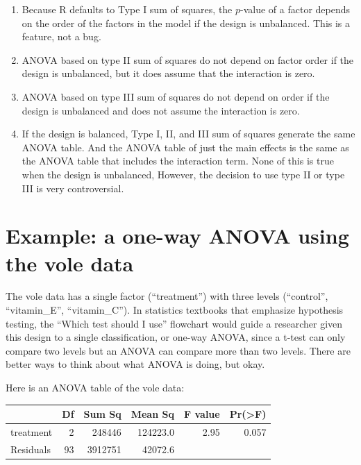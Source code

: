 \documentclass[]{book}
\begin{document}
\begin{enumerate}
\item
  Because R defaults to Type I sum of squares, the \(p\)-value of a
  factor depends on the order of the factors in the model if the design
  is unbalanced. This is a feature, not a bug.
\item
  ANOVA based on type II sum of squares do not depend on factor order if
  the design is unbalanced, but it does assume that the interaction is
  zero.
\item
  ANOVA based on type III sum of squares do not depend on order if the
  design is unbalanced and does not assume the interaction is zero.
\item
  If the design is balanced, Type I, II, and III sum of squares generate
  the same ANOVA table. And the ANOVA table of just the main effects is
  the same as the ANOVA table that includes the interaction term. None
  of this is true when the design is unbalanced, However, the decision
  to use type II or type III is very controversial.
\end{enumerate}

\section{Example: a one-way ANOVA using the vole
data}\label{example-a-one-way-anova-using-the-vole-data}

The vole data has a single factor (``treatment'') with three levels
(``control'', ``vitamin\_E'', ``vitamin\_C''). In statistics textbooks
that emphasize hypothesis testing, the ``Which test should I use''
flowchart would guide a researcher given this design to a single
classification, or one-way ANOVA, since a t-test can only compare two
levels but an ANOVA can compare more than two levels. There are better
ways to think about what ANOVA is doing, but okay.

Here is an ANOVA table of the vole data:

\begin{tabular}{l|r|r|r|r|r}
\hline
  & Df & Sum Sq & Mean Sq & F value & Pr(>F)\\
\hline
treatment & 2 & 248446 & 124223.0 & 2.95 & 0.057\\
\hline
Residuals & 93 & 3912751 & 42072.6 &  & \\
\hline
\end{tabular}
\end{document}

